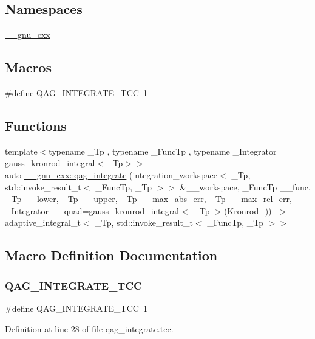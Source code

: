 \subsection*{Namespaces}
\begin{DoxyCompactItemize}
\item 
 \hyperlink{namespace____gnu__cxx}{\+\_\+\+\_\+gnu\+\_\+cxx}
\end{DoxyCompactItemize}
\subsection*{Macros}
\begin{DoxyCompactItemize}
\item 
\#define \hyperlink{qag__integrate_8tcc_a4841ef8575ceba11de892df88ae9f0ef}{Q\+A\+G\+\_\+\+I\+N\+T\+E\+G\+R\+A\+T\+E\+\_\+\+T\+CC}~1
\end{DoxyCompactItemize}
\subsection*{Functions}
\begin{DoxyCompactItemize}
\item 
{\footnotesize template$<$typename \+\_\+\+Tp , typename \+\_\+\+Func\+Tp , typename \+\_\+\+Integrator  = gauss\+\_\+kronrod\+\_\+integral$<$\+\_\+\+Tp$>$$>$ }\\auto \hyperlink{namespace____gnu__cxx_a0057094f91787fe6b44af139bc118a5d}{\+\_\+\+\_\+gnu\+\_\+cxx\+::qag\+\_\+integrate} (integration\+\_\+workspace$<$ \+\_\+\+Tp, std\+::invoke\+\_\+result\+\_\+t$<$ \+\_\+\+Func\+Tp, \+\_\+\+Tp $>$$>$ \&\+\_\+\+\_\+workspace, \+\_\+\+Func\+Tp \+\_\+\+\_\+func, \+\_\+\+Tp \+\_\+\+\_\+lower, \+\_\+\+Tp \+\_\+\+\_\+upper, \+\_\+\+Tp \+\_\+\+\_\+max\+\_\+abs\+\_\+err, \+\_\+\+Tp \+\_\+\+\_\+max\+\_\+rel\+\_\+err, \+\_\+\+Integrator \+\_\+\+\_\+quad=gauss\+\_\+kronrod\+\_\+integral$<$ \+\_\+\+Tp $>$(Kronrod\+\_)) -\/$>$ adaptive\+\_\+integral\+\_\+t$<$ \+\_\+\+Tp, std\+::invoke\+\_\+result\+\_\+t$<$ \+\_\+\+Func\+Tp, \+\_\+\+Tp $>$$>$
\end{DoxyCompactItemize}


\subsection{Macro Definition Documentation}
\mbox{\label{qag__integrate_8tcc_a4841ef8575ceba11de892df88ae9f0ef}} 
\subsubsection{\texorpdfstring{Q\+A\+G\+\_\+\+I\+N\+T\+E\+G\+R\+A\+T\+E\+\_\+\+T\+CC}{QAG\_INTEGRATE\_TCC}}
{\footnotesize\ttfamily \#define Q\+A\+G\+\_\+\+I\+N\+T\+E\+G\+R\+A\+T\+E\+\_\+\+T\+CC~1}



Definition at line 28 of file qag\+\_\+integrate.\+tcc.

